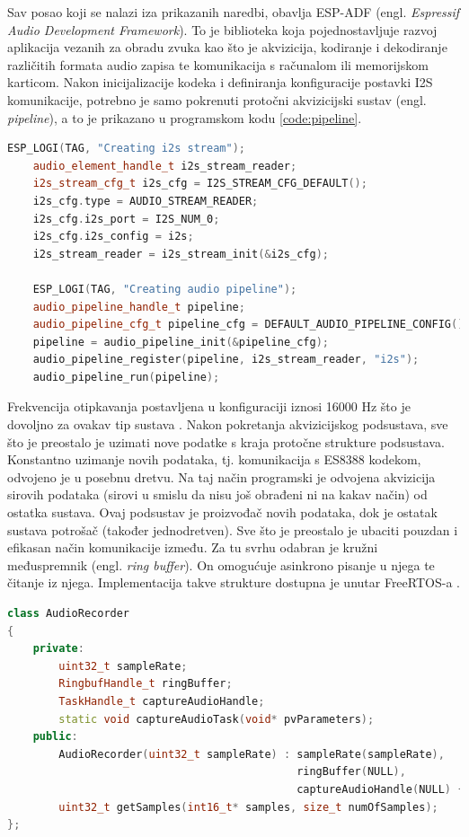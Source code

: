 Sav posao koji se nalazi iza prikazanih naredbi, obavlja ESP-ADF
(engl. \textit{Espressif Audio Development Framework}). To je biblioteka koja pojednostavljuje
razvoj aplikacija vezanih za obradu zvuka kao što je akvizicija, kodiranje i 
dekodiranje različitih formata audio zapisa te komunikacija s računalom ili 
memorijskom karticom.
Nakon inicijalizacije kodeka i definiranja konfiguracije postavki I2S komunikacije,
potrebno je samo pokrenuti protočni akvizicijski sustav (engl. \textit{pipeline}), 
a to je prikazano u programskom kodu \ref{code:pipeline}.\\

\begin{lstlisting}[language=C++, caption=Pokretanje akvizicijskog sustava, label=code:pipeline]
    ESP_LOGI(TAG, "Creating i2s stream");
    audio_element_handle_t i2s_stream_reader;
    i2s_stream_cfg_t i2s_cfg = I2S_STREAM_CFG_DEFAULT();
    i2s_cfg.type = AUDIO_STREAM_READER;
    i2s_cfg.i2s_port = I2S_NUM_0;
    i2s_cfg.i2s_config = i2s;
    i2s_stream_reader = i2s_stream_init(&i2s_cfg);

    ESP_LOGI(TAG, "Creating audio pipeline");
    audio_pipeline_handle_t pipeline;
    audio_pipeline_cfg_t pipeline_cfg = DEFAULT_AUDIO_PIPELINE_CONFIG();
    pipeline = audio_pipeline_init(&pipeline_cfg);
    audio_pipeline_register(pipeline, i2s_stream_reader, "i2s");
    audio_pipeline_run(pipeline);
\end{lstlisting}

Frekvencija otipkavanja postavljena u konfiguraciji iznosi 16000 Hz što
je dovoljno za ovakav tip sustava \cite{wardentinyml}.
Nakon pokretanja akvizicijskog podsustava, sve što je preostalo je uzimati nove
podatke s kraja protočne strukture podsustava. Konstantno uzimanje novih podataka, tj. komunikacija
s ES8388 kodekom, odvojeno je u posebnu dretvu. Na taj način programski je 
odvojena akvizicija sirovih podataka (sirovi u smislu da nisu još obrađeni ni
na kakav način) od ostatka sustava. Ovaj podsustav je proizvođač novih podataka,
dok je ostatak sustava potrošač (također jednodretven). Sve što je preostalo je
ubaciti pouzdan i efikasan način komunikacije između. Za tu svrhu odabran je
kružni međuspremnik (engl. \textit{ring buffer}). On omogućuje asinkrono pisanje u njega
te čitanje iz njega. Implementacija takve strukture dostupna je unutar FreeRTOS-a 
\cite{ringbufferrr}. 


\begin{lstlisting}[language=C++, caption=Razred AudioRecorder, label=code:AudioRecorder]
class AudioRecorder
{
    private:
        uint32_t sampleRate;
        RingbufHandle_t ringBuffer;
        TaskHandle_t captureAudioHandle;
        static void captureAudioTask(void* pvParameters);
    public:
        AudioRecorder(uint32_t sampleRate) : sampleRate(sampleRate), 
                                             ringBuffer(NULL), 
                                             captureAudioHandle(NULL) {}
        uint32_t getSamples(int16_t* samples, size_t numOfSamples);
};
\end{lstlisting}

